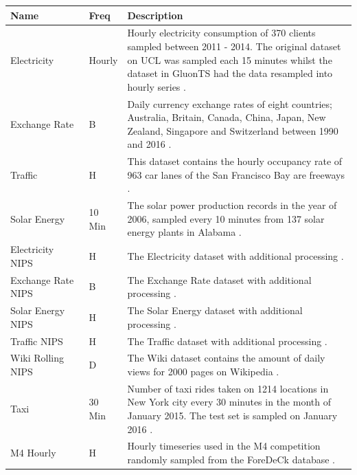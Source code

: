 \begin{table}[ht]
    \centering
    \begin{tabular}{p{0.23\linewidth} | p{0.09\linewidth} | p{0.68\linewidth}}
        Name & Freq & Description \\ \hline
        Electricity & Hourly & Hourly electricity consumption of 370 clients sampled between 2011 - 2014. The original dataset on UCL was sampled each 15 minutes whilst the dataset in GluonTS had the data resampled into hourly series \cite{gluonts-website, salinas_high-dimensional_2019}.\\
        \hline
        Exchange Rate & B & Daily currency exchange rates of eight countries; Australia, Britain, Canada, China, Japan, New Zealand, Singapore and Switzerland between 1990 and 2016  \cite{lai_modeling_2018}. \\
        \hline
        Traffic & H & This dataset contains the hourly occupancy rate of 963 car lanes of the San Francisco Bay are freeways \cite{gluonts-github}. \\
        \hline
        Solar Energy & 10 Min & The solar power production records in the year of 2006, sampled every 10 minutes from 137 solar energy plants in Alabama \cite{lai_modeling_2018}. \\
        \hline
        Electricity NIPS & H & The Electricity dataset with additional processing \cite{salinas_high-dimensional_2019}. \\
        \hline
        Exchange Rate NIPS & B & The Exchange Rate dataset with additional processing \cite{salinas_high-dimensional_2019}. \\
        \hline
        Solar Energy NIPS & H & The Solar Energy dataset with additional processing \cite{salinas_high-dimensional_2019}. \\
        \hline
        Traffic NIPS & H & The Traffic dataset with additional processing \cite{salinas_high-dimensional_2019}. \\
        \hline
        Wiki Rolling NIPS & D & The Wiki dataset contains the amount of daily views for 2000 pages on Wikipedia \cite{salinas_high-dimensional_2019}. \\
        \hline
        Taxi & 30 Min & Number of taxi rides taken on 1214 locations in New York city every 30 minutes in the month of January 2015. The test set is sampled on January 2016 \cite{salinas_high-dimensional_2019}.  \\
        \hline
        M4 Hourly & H & Hourly timeseries used in the M4 competition randomly sampled from the ForeDeCk database \cite{makridakis_m4_2020}.\\

\end{tabular}
\end{table}
